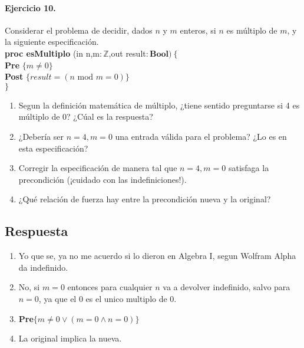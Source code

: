 \documentclass[a4paper]{article}
\begin{document}
\paragraph*{Ejercicio 10.} Considerar el problema de decidir, dados $n$ y $m$ enteros, si $n$ es múltiplo de $m$, y la siguiente especificación. \medskip \\
			\textbf{proc esMultiplo }(in n,m$: \mathbb{Z}$,out result$:\textbf{Bool})
			\ \{$\smallskip \\
			\hspace*{6mm} \textbf{Pre }$\{ m \neq 0\}$\smallskip \\
			\hspace*{6mm} \textbf{Post }$\{result=(n\textrm{ mod }m=0)\}$\\
			$\}$
	\begin{enumerate}[label=\alph*)]
		\item Segun la definición matemática de múltiplo, ¿tiene sentido preguntarse si 4
				es múltiplo de 0? ¿Cúal es la respuesta?
		\item ¿Debería ser $n=4, m=0$ una entrada válida para el problema? ¿Lo es en esta
				especificación?
		\item	Corregir la especificación de manera tal que $n=4, m=0$ satisfaga la precondición
				(¡cuidado con las indefiniciones!).
		\item ¿Qué relación de fuerza hay entre la precondición nueva y la original?
	\end{enumerate}
\subsection*{Respuesta}
	\begin{enumerate}[label=\alph*)]
		\item Yo que se, ya no me acuerdo si lo dieron en Algebra I, segun Wolfram Alpha 
				da indefinido.
		\item No, si $m=0$ entonces para cualquier $n$ va a devolver indefinido, salvo para $n=0$,
				ya que el 0 es el unico multiplo de 0.  
		\item \textbf{Pre}$\{m \neq 0 \vee (m=0\wedge n=0) \}$
		\item La original implica la nueva.
	\end{enumerate}
\end{document}
